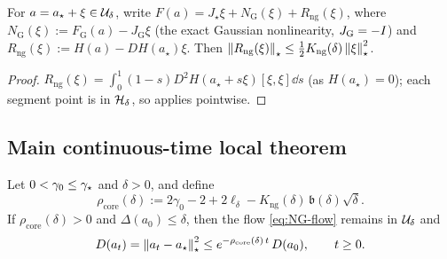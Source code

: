 \begin{corollary}
\label{cor:taylor-ng}
For $a=a_\star+\xi\in\mathcal{U}_\delta$, write $F(a)=J_\star\xi+N_{\mathrm G}(\xi)+R_{\mathrm{ng}}(\xi)$,
where $N_{\mathrm G}(\xi):=F_{\mathrm G}(a)-J_{\mathrm G}\xi$ (the exact Gaussian nonlinearity,
$J_{\mathrm G}=-I$) and $R_{\mathrm{ng}}(\xi):=H(a)-DH(a_\star)\xi$. Then
$\left\lVert R_{\mathrm{ng}}(\xi)\right\rVert_\star\leq\tfrac12K_{\mathrm{ng}}(\delta)\left\lVert \xi\right\rVert_\star^2$.
\end{corollary}

\begin{proof}
$R_{\mathrm{ng}}(\xi)=\int_0^1(1-s)D^2H(a_\star+s\xi)[\xi,\xi]\dd s$ (as $H(a_\star)=0$);
each segment point is in $\mathcal{H}_\delta$, so  applies pointwise.
\end{proof}

\subsection{Main continuous-time local theorem}

\begin{theorem}
\label{thm:core-flow}
Let $0<\gamma_0\leq\gamma_\star$ and $\delta>0$, and define
\begin{equation}
\label{eq:rho-core}
    \rho_{\mathrm{core}}(\delta):=2\gamma_0-2+2\ell_\delta-K_{\mathrm{ng}}(\delta)\,\mathfrak b(\delta)\sqrt\delta .
\end{equation}
If $\rho_{\mathrm{core}}(\delta)>0$ and $\Delta(a_0)\leq\delta$, then the flow
\eqref{eq:NG-flow} remains in $\mathcal{U}_\delta$ and
\[
    D(a_t)=\left\lVert a_t-a_\star\right\rVert_\star^2\leq e^{-\rho_{\mathrm{core}}(\delta)\,t}\,D(a_0),\qquad t\geq0 .
\]
\end{theorem}

